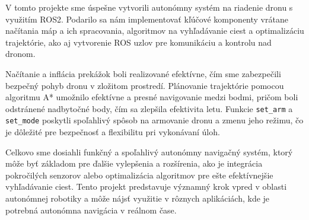 V tomto projekte sme úspešne vytvorili autonómny systém na riadenie dronu s využitím ROS2. Podarilo sa nám implementovať kľúčové komponenty vrátane načítania máp a ich spracovania, algoritmov na vyhľadávanie ciest a optimalizáciu trajektórie, ako aj vytvorenie ROS uzlov pre komunikáciu a kontrolu nad dronom.

Načítanie a inflácia prekážok boli realizované efektívne, čím sme zabezpečili bezpečný pohyb dronu v zložitom prostredí. Plánovanie trajektórie pomocou algoritmu A* umožnilo efektívne a presné navigovanie medzi bodmi, pričom boli odstránené nadbytočné body, čím sa zlepšila efektivita letu. Funkcie \texttt{set\_arm} a \texttt{set\_mode} poskytli spoľahlivý spôsob na armovanie dronu a zmenu jeho režimu, čo je dôležité pre bezpečnosť a flexibilitu pri vykonávaní úloh.

Celkovo sme dosiahli funkčný a spoľahlivý autonómny navigačný systém, ktorý môže byť základom pre ďalšie vylepšenia a rozšírenia, ako je integrácia pokročilých senzorov alebo optimalizácia algoritmov pre ešte efektívnejšie vyhľadávanie ciest. Tento projekt predstavuje významný krok vpred v oblasti autonómnej robotiky a môže nájsť využitie v rôznych aplikáciách, kde je potrebná autonómna navigácia v reálnom čase.
